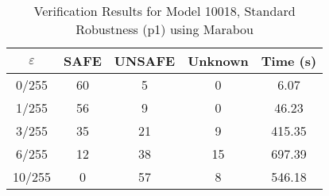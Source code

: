 \begin{table}[htbp]
\centering
\caption{Verification Results for Model 10018, Standard Robustness (p1) using Marabou}
\label{tab:model10018_p1_marabou}
\begin{tabular}{|c|c|c|c|c|}
\hline
$\varepsilon$ & SAFE & UNSAFE & Unknown & Time (s) \\ \hline
0/255 & 60 & 5 & 0 & 6.07 \\ \hline
1/255 & 56 & 9 & 0 & 46.23 \\ \hline
3/255 & 35 & 21 & 9 & 415.35 \\ \hline
6/255 & 12 & 38 & 15 & 697.39 \\ \hline
10/255 & 0 & 57 & 8 & 546.18 \\ \hline
\end{tabular}
\end{table}
